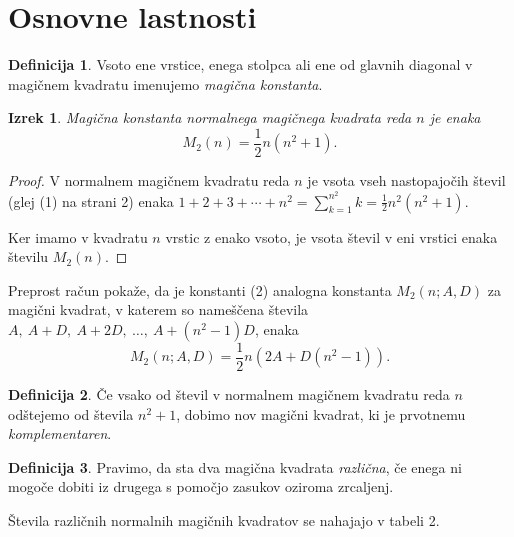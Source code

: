 \documentclass[a4paper,12pt]{article}
\theoremstyle{definition}
\newtheorem{definicija}{Definicija}
\theoremstyle{plain}
\newtheorem{izrek}{Izrek}
\begin{document}

\section{Osnovne lastnosti}

   \begin{definicija}
      Vsoto ene vrstice, enega stolpca ali ene od glavnih diagonal
      v magičnem kvadratu imenujemo \emph{magična konstanta}.
   \end{definicija}

\begin{izrek}
    \emph{Magična konstanta normalnega magičnega kvadrata reda \(n\)}
    je enaka
    \begin{equation}
        M_2(n) = \frac{1}{2}n(n^2+1).
        \label{eq:mc}
    \end{equation}
\end{izrek}


\begin{proof}
    V normalnem magičnem kvadratu reda \(n\) je vsota vseh
    nastopajočih števil (glej (1) na strani 2) enaka
    \(1+2+3+\cdots+n^2=\sum_{k=1}^{n^2}k
    =\frac{1}{2}n^2(n^2+1)\).

    Ker imamo v kvadratu \(n\) vrstic z enako vsoto, je
    vsota števil v eni vrstici enaka številu \(M_2(n)\).
\end{proof}


Preprost račun pokaže, da je konstanti (2) analogna
konstanta \(M_2(n;A,D)\) za magični kvadrat, v katerem
so nameščena števila
\(A,\ A+D,\ A+2D,\ \ldots,\ A+(n^2-1)D\), enaka %
\begin{equation}
    M_2(n;A,D)=\frac{1}{2}n(2A+D(n^2-1)).
    \label{eq:mc}
\end{equation}

\begin{definicija}
    Če vsako od števil v normalnem magičnem kvadratu reda
    \(n\) odštejemo od števila \(n^2+1\), dobimo nov
    magični kvadrat, ki je prvotnemu
    \emph{komplementaren}.
\end{definicija}

\begin{definicija}
      Pravimo, da sta dva magična kvadrata \emph{različna}, če enega ni mogoče dobiti
      iz drugega s pomočjo zasukov oziroma zrcaljenj.
\end{definicija}

Števila različnih normalnih magičnih kvadratov se nahajajo v tabeli 2.
\end{document}
